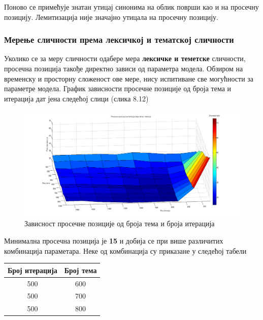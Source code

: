 Поново се примећује знатан утицај синонима на облик површи као и на просечну позицију. Лемитизација није значајно утицала на просечну позицију.



\subsubsection{Мерење сличности према лексичкој и тематској сличности}
	
Уколико се за меру сличности одабере мера  \textbf{лексичке и теметске} сличности, просечна позиција такође директно зависи од параметра модела. Обзиром на временску и просторну сложеност ове мере, нису испитиване све могућности за параметре модела. График зависности просечне позиције од броја тема и итерација дат јена следећој слици (слика 8.12)

		\begin{figure}[H]
    \centering
   \includegraphics[scale=0.3]{./Slike/distLemmSyn.png} 
	\caption{Зависност просечне позиције од броја тема и броја итерација}
	\label{fig:slika1}
\end{figure}

Минимална просечна позиција је \textbf{15} и добија се при више различитих комбинација параметара. Неке од комбинација су приказане у следећој табели

\begin{center}
\begin{tabular}{|c|c|}
\hline
Број итерација & Број тема \\
\hline\hline
500 & 600 \\
500 & 700 \\
500 & 800 \\
\hline
\end{tabular}

\end{center}




